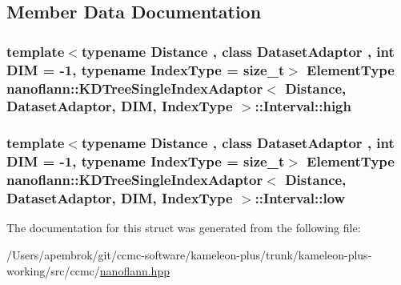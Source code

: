 \subsection{Member Data Documentation}
\hypertarget{structnanoflann_1_1_k_d_tree_single_index_adaptor_1_1_interval_a5b1d4df37a01d6a2154cb89dbd53456e}{
\subsubsection[{high}]{\setlength{\rightskip}{0pt plus 5cm}template$<$typename Distance , class Dataset\-Adaptor , int D\-I\-M = -\/1, typename Index\-Type  = size\-\_\-t$>$ {\bf Element\-Type} {\bf nanoflann\-::\-K\-D\-Tree\-Single\-Index\-Adaptor}$<$ Distance, Dataset\-Adaptor, D\-I\-M, Index\-Type $>$\-::Interval\-::high}}\label{structnanoflann_1_1_k_d_tree_single_index_adaptor_1_1_interval_a5b1d4df37a01d6a2154cb89dbd53456e}
\hypertarget{structnanoflann_1_1_k_d_tree_single_index_adaptor_1_1_interval_a96020845859d090c3f46f1656faeb45d}{
\subsubsection[{low}]{\setlength{\rightskip}{0pt plus 5cm}template$<$typename Distance , class Dataset\-Adaptor , int D\-I\-M = -\/1, typename Index\-Type  = size\-\_\-t$>$ {\bf Element\-Type} {\bf nanoflann\-::\-K\-D\-Tree\-Single\-Index\-Adaptor}$<$ Distance, Dataset\-Adaptor, D\-I\-M, Index\-Type $>$\-::Interval\-::low}}\label{structnanoflann_1_1_k_d_tree_single_index_adaptor_1_1_interval_a96020845859d090c3f46f1656faeb45d}


The documentation for this struct was generated from the following file\-:\begin{DoxyCompactItemize}
\item 
/\-Users/apembrok/git/ccmc-\/software/kameleon-\/plus/trunk/kameleon-\/plus-\/working/src/ccmc/\hyperlink{nanoflann_8hpp}{nanoflann.\-hpp}\end{DoxyCompactItemize}

